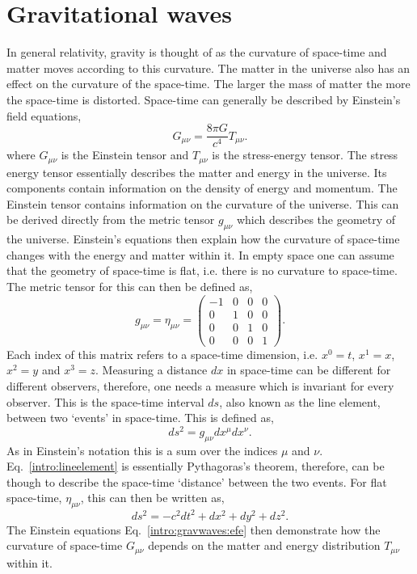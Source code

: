 \section{\label{intro:gravwaves}Gravitational waves}

In general relativity, gravity is thought of as the curvature of space-time and matter moves according to this curvature. 
The matter in the universe also has an effect on the curvature of the space-time.
The larger the mass of matter the more the space-time is distorted.
Space-time can generally be described by Einstein's field equations,
\begin{equation}
\label{intro:gravwaves:efe}
    G_{\mu \nu} = \frac{8 \pi G}{c^4}T_{\mu \nu}.
\end{equation}
where $G_{\mu \nu}$ is the Einstein tensor and $T_{\mu \nu}$ is the stress-energy tensor.
The stress energy tensor essentially describes the matter and energy in the universe. Its components contain information on the density of energy and momentum.
The Einstein tensor contains information on the curvature of the universe. 
This can be derived directly from the metric tensor $g_{\mu \nu}$ which describes the geometry of the universe.
Einstein's equations then explain how the curvature of space-time changes with the energy and matter within it. 
In empty space one can assume that the geometry of space-time is flat, i.e. there is no curvature to space-time. The metric tensor for this can then be defined as,
\begin{equation}
g_{\mu \nu} = \eta_{\mu \nu} = \left(
\begin{matrix}
-1 & 0 & 0 & 0 \\
0 & 1 & 0 & 0 \\
0 & 0 & 1 & 0 \\
0 & 0 & 0 & 1 
\end{matrix}
\right).
\end{equation}
Each index of this matrix refers to a space-time dimension, i.e. $x^0 = t$, $x^1=x$, $x^2=y$ and $x^3=z$. 
Measuring a distance $dx$ in space-time can be different for different observers, therefore, one needs a measure which is invariant for every observer. 
This is the space-time interval $ds$, also known as the line element, between two `events' in space-time. 
This is defined as,
\begin{equation}
\label{intro:lineelement}
    ds^2 = g_{\mu \nu} dx^{\mu}dx^{\nu}.
\end{equation}
As in Einstein's notation this is a sum over the indices $\mu$ and $\nu$.  
Eq.~\ref{intro:lineelement} is essentially Pythagoras's theorem, therefore, can be though to describe the space-time `distance' between the two events.
For flat space-time, $\eta_{\mu\nu}$, this can then be written as,
\begin{equation}
    ds^2 = -c^2 dt^2 + dx^2 + dy^2 + dz^2.
\end{equation}
The Einstein equations Eq.~\ref{intro:gravwaves:efe} then demonstrate how the curvature of space-time $G_{\mu\nu}$ depends on the matter and energy distribution $T_{\mu \nu}$ within it.

